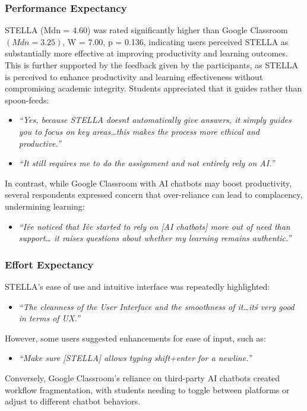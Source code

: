 \documentclass[sigconf,natbib=true]{acmart}
\begin{document}
\subsubsection{Performance Expectancy}
STELLA (Mdn = 4.60) was rated significantly higher than Google Classroom $(Mdn = 3.25)$, W = 7.00, p = 0.136, indicating users perceived STELLA as substantially more effective at improving productivity and learning outcomes. This is further supported by the feedback given by the participants, as STELLA is perceived to enhance productivity and learning effectiveness without compromising academic integrity. Students appreciated that it guides rather than spoon-feeds:
\begin{itemize}
  \item \textit{“Yes, because STELLA doesn\'t automatically give answers, it simply guides you to focus on key areas\ldots this makes the process more ethical and productive.”}
  \item \textit{“It still requires me to do the assignment and not entirely rely on AI.”}
\end{itemize}
In contrast, while Google Classroom with AI chatbots may boost productivity, several respondents expressed concern that over-reliance can lead to complacency, undermining learning:
\begin{itemize}
\item \textit{“I\'ve noticed that I\'ve started to rely on [AI chatbots] more out of need than support… it raises questions about whether my learning remains authentic.”}
\end{itemize}

\subsubsection{Effort Expectancy}
STELLA's ease of use and intuitive interface was repeatedly highlighted:
\begin{itemize}
\item \textit{“The cleanness of the User Interface and the smoothness of it\ldots it\'s very good in terms of UX.”}
\end{itemize}
However, some users suggested enhancements for ease of input, such as:
\begin{itemize}
\item \textit{“Make sure [STELLA] allows typing shift+enter for a newline.”}
\end{itemize}
Conversely, Google Classroom's reliance on third-party AI chatbots created workflow fragmentation, with students needing to toggle between platforms or adjust to different chatbot behaviors.
\end{document}
